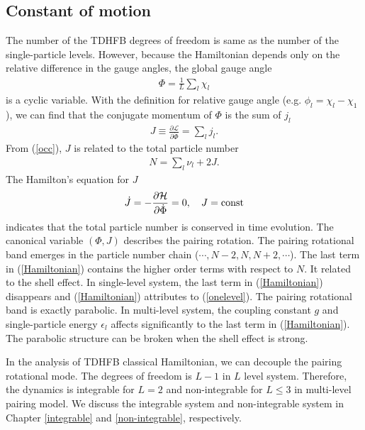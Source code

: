 \documentclass[11pt]{book} %
\begin{document}
\subsection{Constant of motion}
\label{constant}
The number of the TDHFB degrees of freedom is same as the number of the single-particle levels. However, because the Hamiltonian depends only on the relative difference in the gauge angles, the global gauge angle 
\begin{align}
	\Phi = \frac{1}{L}\sum_l \chi_l
\end{align}
is a cyclic variable. With the definition for relative gauge angle (e.g. $\phi_l = \chi_l-\chi_1$), we can find that the conjugate momentum of $\Phi$ is the sum of $j_l$
\begin{align}
	J \equiv \frac{\partial\mathcal{L}}{\partial\dot{\Phi}} = \sum_l j_l .
\end{align}
From (\ref{occ}), $J$ is related to the total particle number
\begin{align}
	N = \sum_l \nu_l + 2J .
\end{align}
The Hamilton's equation for $J$
\begin{align}
	\dot{J} = -\frac{\partial\mathcal{H}}{\partial \dot{\Phi}} = 0, \quad J = {\rm const}
\end{align}
indicates that the total particle number is conserved in time evolution.
The canonical variable $(\Phi,J)$ describes the pairing rotation. The pairing rotational band emerges in the particle number chain ($\cdots,N-2,N,N+2,\cdots$). The last term in (\ref{Hamiltonian}) contains the higher order terms with respect to $N$. It related to the shell effect. In single-level system, the last term in (\ref{Hamiltonian}) disappears and (\ref{Hamiltonian}) attributes to (\ref{onelevel}). The pairing rotational band is exactly parabolic. In multi-level system, the coupling constant $g$ and single-particle energy $\epsilon_l$ affects significantly to the last term in (\ref{Hamiltonian}). The parabolic structure can be broken when the shell effect is strong. 

In the analysis of TDHFB classical Hamiltonian, we can decouple the pairing rotational mode. The degrees of freedom is $L-1$ in $L$ level system. Therefore, the dynamics is integrable for $L=2$ and non-integrable for $L\le 3$ in multi-level pairing model. We discuss the integrable system and non-integrable system in Chapter \ref{integrable} and \ref{non-integrable}, respectively. 
\end{document}

